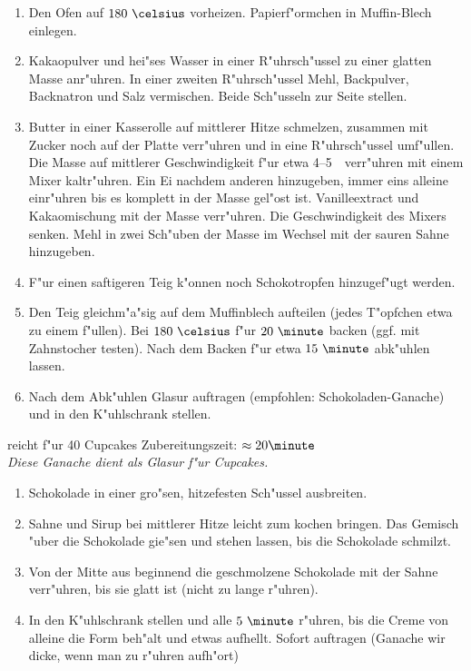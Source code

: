 \begin{enumerate}
 \item	Den Ofen auf $180~\celsius$ vorheizen. Papierf"ormchen in Muffin-Blech einlegen.
 \item	Kakaopulver und hei"ses Wasser in einer R"uhrsch"ussel zu einer glatten Masse anr"uhren.
	In einer zweiten R"uhrsch"ussel Mehl, Backpulver, Backnatron und Salz vermischen.
	Beide Sch"usseln zur Seite stellen.
 \item	Butter in einer Kasserolle auf mittlerer Hitze schmelzen, zusammen mit Zucker noch auf der Platte verr"uhren und in eine
	R"uhrsch"ussel umf"ullen.
	Die Masse auf mittlerer Geschwindigkeit f"ur etwa 4--5~\minute\ verr"uhren mit einem Mixer kaltr"uhren.
	Ein Ei nachdem anderen hinzugeben, immer eins alleine einr"uhren bis es komplett in der Masse gel"ost ist.
	Vanilleextract und Kakaomischung mit der Masse verr"uhren.
	Die Geschwindigkeit des Mixers senken.
	Mehl in zwei Sch"uben der Masse im Wechsel mit der sauren Sahne hinzugeben.
 \item  F"ur einen saftigeren Teig k"onnen noch Schokotropfen hinzugef"ugt werden.
 \item	Den Teig gleichm"a"sig auf dem Muffinblech aufteilen (jedes T"opfchen etwa zu einem  f"ullen).
	Bei $180~\celsius$ f"ur $20~\minute$ backen (ggf. mit Zahnstocher testen).
	Nach dem Backen f"ur etwa $15~\minute$ abk"uhlen lassen.
 \item Nach dem Abk"uhlen Glasur auftragen (empfohlen: Schokoladen-Ganache) und in den K"uhlschrank stellen.
\end{enumerate}
reicht f"ur 40 Cupcakes \hfill Zubereitungszeit: $\approx20 \minute$
\hspace{0em}\\
\textit{Diese Ganache dient als Glasur f"ur Cupcakes.}
\begin{enumerate}
 \item	Schokolade in einer gro"sen, hitzefesten Sch"ussel ausbreiten.
 \item	Sahne und Sirup bei mittlerer Hitze leicht zum kochen bringen.
	Das Gemisch "uber die Schokolade gie"sen und stehen lassen, bis die Schokolade schmilzt.
 \item	Von der Mitte aus beginnend die geschmolzene Schokolade mit der Sahne verr"uhren, bis sie glatt ist (nicht zu lange r"uhren).
 \item	In den K"uhlschrank stellen und alle $5~\minute$ r"uhren, bis die Creme von alleine die Form beh"alt und etwas aufhellt.
	Sofort auftragen (Ganache wir dicke, wenn man zu r"uhren aufh"ort)
\end{enumerate}


